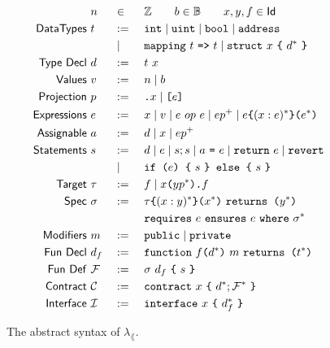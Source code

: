 \begin{figure}
  \begin{alignat*}{3}
    &~ n && \in && \mathbb{Z} \qquad b \in \mathbb{B} \qquad x,y,f \in \mathsf{Id}   \\
    \mathsf{Data Types} &~ t && :=\ && \texttt{int} \mid \texttt{uint} \mid \texttt{bool} \mid \texttt{address} \\
                &~   && \mid\ && \texttt{mapping} ~t~ \texttt{=>} ~t \mid \texttt{struct} ~x~ \texttt{\{}~ d^* ~\texttt{\}} \\
    \mathsf{Type~Decl}    &~ d && :=\ && t ~ x \\
    \mathsf{Values}      &~ v && :=\ && n \mid b \\
    \mathsf{Projection}  &~ p && :=\ && \texttt{.}x \mid \texttt{[}e\texttt{]} \\
    \mathsf{Expressions} &~ e && :=\ && x \mid v \mid e ~op~ e \mid e p^+ \mid {e}\texttt{\{}{(x: e)^*}\texttt{\}(}{e^*}\texttt{)} \\
    \mathsf{Assignable}  &~ a && :=\ && d \mid x \mid e p^+ \\
    \mathsf{Statements}  &~ s && :=\ && d \mid e \mid s; s \mid a ~\texttt{=}~ e \mid \texttt{return}~ e \mid \texttt{revert} \\
                      &~   && \mid\ && \texttt{if (}e\texttt{) \{}~ s ~\texttt{\} else \{}~ s ~\texttt{\}} \\
    \mathsf{Target}      &~ \tau && :=\ && f \mid x \texttt{(} y p^* \texttt{).}f \\
    \mathsf{Spec}        &~ \sigma && :=\ && {\tau}\texttt{\{}{(x : y)^*}\texttt{\}(}{x^*}\texttt{)} ~\texttt{returns (}{y^*}\texttt{)} \\
                      &~        &&     && \texttt{requires}~ {e} ~\texttt{ensures}~ {e} ~\texttt{where}~ {\sigma^*} \\
    \mathsf{Modifiers}   &~ m && :=\ && \texttt{public} \mid \texttt{private} \\
    \mathsf{Fun~Decl}    &~ d_f && :=\ && \texttt{function}~ {f}\texttt{(}{d^*}\texttt{)} ~ {m} ~\texttt{returns (}{t^*}\texttt{)} \\
    \mathsf{Fun~Def}     &~ \mathcal{F}&& :=\ && \sigma ~ d_f ~ \texttt{\{} ~ s ~ \texttt{\}} \\
    \mathsf{Contract}    &~ \mathcal{C}&& :=\ && \texttt{contract}~ {x}~ \texttt{\{}~ {d^*}; {\mathcal{F}^*} ~\texttt{\}} \\
    \mathsf{Interface}   &~ \mathcal{I}&& :=\ && \texttt{interface}~ {x}~ \texttt{\{}~ {d_f^*} ~\texttt{\}}
  \end{alignat*}
  \caption{The abstract syntax of $\lambda_\lang$.}
  \label{fig:syntax}
\end{figure}

\iffalse

